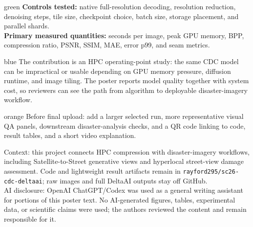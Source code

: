 \documentclass{article}
\begin{document}
\vspace{0.45in}

\begin{minipage}[t]{0.31\linewidth}
\vspace{0pt}
\begin{posterbox}{green}
{\fontsize{24}{30}\selectfont
\textbf{Controls tested:} native full-resolution decoding, resolution reduction, denoising steps, tile size, checkpoint choice, batch size, storage placement, and parallel shards.\\[8pt]
\textbf{Primary measured quantities:} seconds per image, peak GPU memory, BPP, compression ratio, PSNR, SSIM, MAE, error p99, and seam metrics.}
\end{posterbox}
\end{minipage}
\hfill
\begin{minipage}[t]{0.36\linewidth}
\vspace{0pt}
\begin{posterbox}{blue}
{\fontsize{24}{30}\selectfont
The contribution is an HPC operating-point study: the same CDC model can be impractical or usable depending on GPU memory pressure, diffusion runtime, and image tiling. The poster reports model quality together with system cost, so reviewers can see the path from algorithm to deployable disaster-imagery workflow.}
\end{posterbox}
\end{minipage}
\hfill
\begin{minipage}[t]{0.29\linewidth}
\vspace{0pt}
\begin{posterbox}{orange}
{\fontsize{24}{30}\selectfont
Before final upload: add a larger selected run, more representative visual QA panels, downstream disaster-analysis checks, and a QR code linking to code, result tables, and a short video explanation.}
\end{posterbox}
\end{minipage}

\vfill
{\fontsize{19}{23}\selectfont\color{muted}
Context: this project connects HPC compression with disaster-imagery workflows, including Satellite-to-Street generative views and hyperlocal street-view damage assessment. Code and lightweight result artifacts remain in \texttt{rayford295/sc26-cdc-deltaai}; raw images and full DeltaAI outputs stay off GitHub.\\
AI disclosure: OpenAI ChatGPT/Codex was used as a general writing assistant for portions of this poster text. No AI-generated figures, tables, experimental data, or scientific claims were used; the authors reviewed the content and remain responsible for it.}
\end{document}
